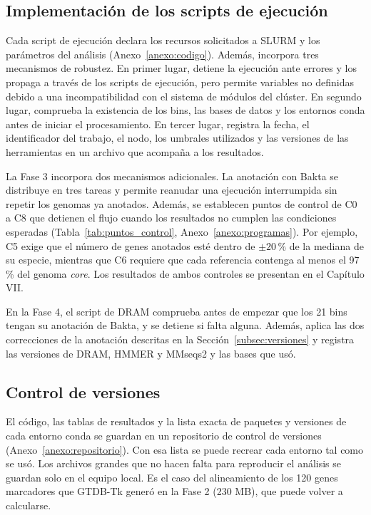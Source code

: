 \subsection{Implementación de los scripts de ejecución}

Cada script de ejecución declara los recursos solicitados a SLURM y los parámetros del análisis 
(Anexo~\ref{anexo:codigo}). Además, incorpora tres mecanismos de robustez. En primer lugar, 
detiene la ejecución ante errores y los propaga a través de los scripts de ejecución, pero permite variables 
no definidas debido a una incompatibilidad con el sistema de módulos del clúster. En segundo lugar, 
comprueba la existencia de los bins, las bases de datos y los entornos conda antes de iniciar el 
procesamiento. En tercer lugar, registra la fecha, el identificador del trabajo, el nodo, los 
umbrales utilizados y las versiones de las herramientas en un archivo que acompaña a los resultados.

La Fase 3 incorpora dos mecanismos adicionales. La anotación con Bakta se distribuye en tres 
tareas y permite reanudar una ejecución interrumpida sin repetir los genomas ya anotados. Además, 
se establecen puntos de control de C0 a C8 que detienen el flujo cuando los resultados no cumplen 
las condiciones esperadas (Tabla~\ref{tab:puntos_control}, Anexo~\ref{anexo:programas}). Por ejemplo, C5 exige que el número de genes anotados esté dentro 
de $\pm 20$\,\% de la mediana de su especie, mientras que C6 requiere que cada referencia contenga 
al menos el 97\,\% del genoma \textit{core}. Los resultados de ambos controles se presentan en el 
Capítulo VII.

\begin{nuevo}
En la Fase 4, el script de DRAM comprueba antes de empezar que los 21 bins
tengan su anotación de Bakta, y se detiene si falta alguna. Además, aplica las
dos correcciones de la anotación descritas en la
Sección~\ref{subsec:versiones} y registra las versiones de DRAM, HMMER y
MMseqs2 y las bases que usó.
\end{nuevo}

\subsection{Control de versiones}

El código, las tablas de resultados y la lista exacta de paquetes y versiones
de cada entorno conda se guardan en un repositorio de control de versiones
(Anexo~\ref{anexo:repositorio}). Con esa lista se puede recrear cada entorno
tal como se usó. Los archivos grandes que no hacen falta para reproducir el
análisis se guardan solo en el equipo local. Es el caso del alineamiento de los
120 genes marcadores que GTDB-Tk generó en la Fase 2 (230 MB), que puede
volver a calcularse.


